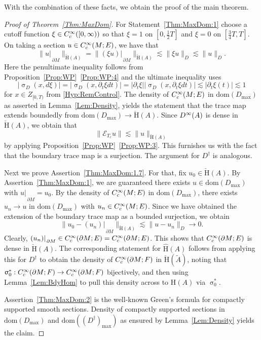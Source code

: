 \documentclass[a4paper,10pt,reqno]{amsart}
\newcommand{\sym}{\upsigma}
\newcommand{\rest}[1]{{{\lvert_{}}_{}}_{#1}}
\newcommand{\modulus}[1]{|#1|}
\newcommand{\norm}[1]{\| #1 \|}%
\newcommand{\Ck}[2][{}]{{\rm C}^{#2}_{\rm #1}}%
\newcommand{\Dk}[2][{}]{{\rm D}^{#2}_{\rm #1}}%
\newcommand{\checkH}{\check{\mathrm{H}}}
\newcommand{\hatH}{\hat{\mathrm{H}}}
\newcommand{\dom}{\mathrm{dom}}
\newcommand{\ext}{\mathcal{E}}
\newcommand{\dM}{\partial M}
\theoremstyle{definition}
\begin{document}
With the combination of these facts, we obtain the proof of the main theorem.
\begin{proof}[Proof of Theorem~\ref{Thm:MaxDom}]
For Statement~\ref{Thm:MaxDom:1} choose a cutoff function $\xi\in \Ck[c]{\infty}([0,\infty))$ so that $\xi = 1$ on $[0,\frac{1}{2}T]$ and $\xi = 0$ on $[\frac{3}{4}T,T]$.
On taking a section $u \in \Ck[c]{\infty}(M;E)$, we have that
$$ \norm{u \rest{\dM}}_{\checkH(A)} = \norm{(\xi u)\rest{\dM}}_{\checkH(A)} \lesssim \norm{ \xi u}_{D} \lesssim \norm{u}_{D}.$$
Here the penultimate inequality follows from Proposition~\ref{Prop:WP}~\ref{Prop:WP:4} and the ultimate inequality uses
$$\modulus{\sym_D (x,d \xi)} = \modulus{\sym_{D}(x,\partial_t \xi dt)} = \modulus{\partial_t \xi} \modulus{ \sym_{D}(x,\partial_t \xi dt)} \lesssim \modulus{\partial_t \xi(t)} \lesssim 1$$
for $x \in Z_{[0,T)}$ from \ref{Hyp:RemControl}.
The density of $\Ck[c]{\infty}(M;E)$ in $\dom(D_{\max})$ as asserted in Lemma~\ref{Lem:Density}, yields the statement that the trace map extends boundedly from $\dom(D_{\max}) \to \checkH(A)$.
Since $\Dk{\infty}(A)$ is dense in $\checkH(A)$, we obtain that
$$ \norm{\ext_{T_c} u} \lesssim \norm{u}_{\checkH(A)}$$
by applying Proposition~\ref{Prop:WP}~\ref{Prop:WP:3}.
This furnishes us with the fact that the boundary trace map is a surjection.
The argument for $D^\dagger$ is analogous.

Next we prove Assertion~\ref{Thm:MaxDom:1.7}.
For that, fix $u_0 \in \checkH(A)$.
By Assertion~\ref{Thm:MaxDom:1}, we are guaranteed there exists $u \in \dom(D_{\max})$ with $u\rest{\dM} = u_0$.
By the density of $\Ck[c]{\infty}(M;E)$ in $\dom(D_{\max})$, there exists $u_n \to u$ in $\dom(D_{\max})$ with $u_n \in \Ck[c]{\infty}(M;E)$.
Since we have obtained the extension of the boundary trace map as a bounded surjection, we obtain
$$\norm{u_0 - (u_n)\rest{\dM}}_{\checkH(A)} \lesssim \norm{u - u_n}_D \to 0.$$
Clearly, $(u_n)\rest{\dM} \in \Ck[c]{\infty}(\dM;E) = \Ck[c]{\infty}(\dM;E)$.
This shows that $\Ck[c]{\infty}(\dM;E)$ is dense in $\checkH(A)$.
The corresponding statement for $\hatH(A)$ follows from applying this for $D^\dagger$ to obtain the density of $\Ck[c]{\infty}(\dM;F)$ in $\checkH(\tilde{A})$, noting that $\sym_0^\ast:\Ck[c]{\infty}(\dM;F) \to \Ck[c]{\infty}(\dM;F)$ bijectively, and then using Lemma~\ref{Lem:BdyHom} to pull this density across to $\hatH(A)$ via $\sym_0^\ast$.

Assertion~\ref{Thm:MaxDom:2} is the well-known Green's formula for compactly supported smooth sections.
Density of compactly supported sections in $\dom(D_{\max})$ and $\dom((D^{\dagger})_{\max})$ as ensured by Lemma~\ref{Lem:Density} yields the claim.


\end{proof}
\end{document}
